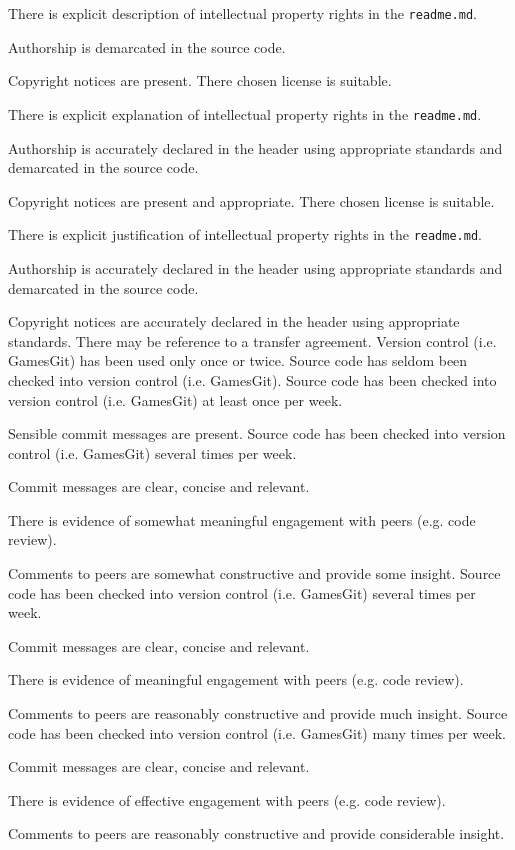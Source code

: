 \documentclass{../../fal_assignment}
\begin{document}
\begin{markingrubric}
            \par There is explicit description of intellectual property rights in the \texttt{readme.md}.
            \par Authorship is demarcated in the source code.
            \par Copyright notices are present.
        \grade There chosen license is suitable. 
            \par There is explicit explanation of intellectual property rights in the \texttt{readme.md}.
            \par Authorship is accurately declared in the header using appropriate standards and demarcated in the source code.
            \par Copyright notices are present and appropriate.
        \grade There chosen license is suitable.
            \par There is explicit justification of intellectual property rights in the \texttt{readme.md}.
            \par Authorship is accurately declared in the header using appropriate standards and demarcated in the source code.
            \par Copyright notices are accurately declared in the header using appropriate standards. There may be reference to a transfer agreement.
%
        \grade\fail Version control (i.e. GamesGit) has been used only once or twice.
        \grade Source code has seldom been checked into version control (i.e. GamesGit).
        \grade Source code has been checked into version control (i.e. GamesGit) at least once per week.
            \par Sensible commit messages are present.
        \grade Source code  has been checked into version control (i.e. GamesGit) several times per week.
            \par Commit messages are clear, concise and relevant.
            \par There is evidence of somewhat meaningful engagement with peers (e.g. code review).
            \par Comments to peers are somewhat constructive and provide some insight.
        \grade Source code has been checked into version control (i.e. GamesGit) several times per week.
            \par Commit messages are clear, concise and relevant.
            \par There is evidence of meaningful engagement with peers (e.g. code review).
            \par Comments to peers are reasonably constructive and provide much insight.
        \grade Source code has been checked into version control (i.e. GamesGit) many times per week.
            \par Commit messages are clear, concise and relevant.
            \par There is evidence of effective engagement with peers (e.g. code review).
            \par Comments to peers are reasonably constructive and provide considerable insight.
%
\end{markingrubric}
\end{document}
